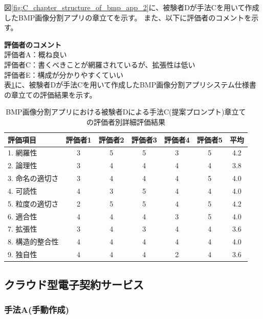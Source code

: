図\ref{fig:C_chapter_structure_of_bmp_app_2}に、被験者Dが手法Cを用いて作成したBMP画像分割アプリの章立てを示す。
また、以下に評価者のコメントを示す。

\noindent\textbf{評価者のコメント}\\
評価者A：概ね良い\\
評価者C：書くべきことが網羅されているが、拡張性は低い\\
評価者E：構成が分かりやすくていい\\

表\ref{tb:detailed_evaluation_results_C2}に、被験者Dが手法Cを用いて作成したBMP画像分割アプリシステム仕様書の章立ての評価結果を示す。

\begin{table}[tp]
  \caption{BMP画像分割アプリにおける被験者Dによる手法C(提案プロンプト)章立ての評価者別詳細評価結果}
  \label{tb:detailed_evaluation_results_C2}
  \centering
  \begin{tabular}{|l|c|c|c|c|c|c|}
    \hline
    \textbf{評価項目} & \textbf{評価者1} & \textbf{評価者2} & \textbf{評価者3} & \textbf{評価者4} & \textbf{評価者5} & \textbf{平均} \\
    \hline\hline
    1. 網羅性 & 3 & 5 & 5 & 3 & 5 & 4.2 \\
    \hline
    2. 論理性 & 3 & 4 & 4 & 4 & 4 & 3.8 \\
    \hline
    3. 命名の適切さ & 3 & 4 & 4 & 4 & 5 & 4.0 \\
    \hline
    4. 可読性 & 4 & 3 & 5 & 4 & 4 & 4.0 \\
    \hline
    5. 粒度の適切さ & 2 & 5 & 5 & 4 & 5 & 4.2 \\
    \hline
    6. 適合性 & 4 & 4 & 4 & 3 & 5 & 4.0 \\
    \hline
    7. 拡張性 & 3 & 4 & 3 & 4 & 4 & 3.6 \\
    \hline
    8. 構造的整合性 & 4 & 4 & 4 & 4 & 4 & 4.0 \\
    \hline
    9. 独自性 & 4 & 4 & 4 & 2 & 4 & 3.6 \\
    \hline
  \end{tabular}
\end{table}




\subsection{クラウド型電子契約サービス}
\subsubsection{手法A(手動作成)}

